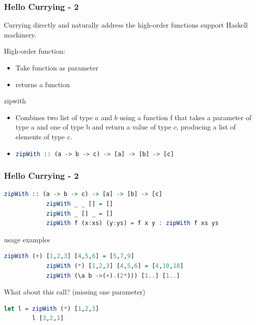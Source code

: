 		\begin{frame}[fragile]\frametitle{Hello Currying - 2}
		Currying directly and naturally address the  high-order functions support
		 Haskell machinery.
		 \begin{alertblock}{High-order function:}
		 \begin{itemize}
		   \item Take function as parameter
		   \item returns a function%
		\end{itemize}
		 \end{alertblock}
		 
		 \begin{exampleblock}{zipwith}
		  \begin{itemize}
		   \item Combines two list of type $a$ and $b$ using a function f that takes a
		   parameter of type a and one of type b and return a value of type $c$,
		   producing a list of elements of type $c$.
		   \item 
		 \begin{lstlisting}[language=Haskell,xleftmargin=-0.3em]
			zipWith :: (a -> b -> c) -> [a] -> [b] -> [c]
		\end{lstlisting}
		\end{itemize}
		 \end{exampleblock}
		
		
		\end{frame}
		
		
		
		\begin{frame}[fragile]\frametitle{Hello Currying - 2}
		
		\begin{lstlisting}[language=Haskell,xleftmargin=-0.3em]
			zipWith :: (a -> b -> c) -> [a] -> [b] -> [c]
			zipWith _ _ [] = []
			zipWith _ [] _ = []
			zipWith f (x:xs) (y:ys) = f x y : zipWith f xs ys
		\end{lstlisting}
		 \begin{exampleblock}{usage examples}
		  \begin{lstlisting}[language=Haskell,xleftmargin=-0.3em]
			zipWith (+) [1,2,3] [4,5,6] = [5,7,9]
			zipWith (*) [1,2,3] [4,5,6] = [4,10,18]
			zipWith (\a b ->(+).(2*))) [1..] [1..]
		\end{lstlisting}
		What about this call? (missing one parameter)
		\begin{lstlisting}[language=Haskell]
		let l = zipWith (*) [1,2,3] 
		l [3,2,1]
		\end{lstlisting}
		 \end{exampleblock}
		
		\end{frame}
		
